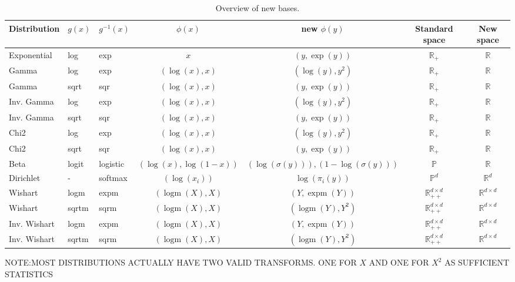 \documentclass{article}
\begin{document}
\begin{table}[htb]
	\centering
	\caption{Overview of new bases.}
	\begin{tabular}{lllcccc}
		\toprule
		\textbf{Distribution}	&\textbf{$g(x)$} &\textbf{$g^{-1}(x)$} & $\phi(x)$ & new $\phi(y)$ & Standard space & New space	\\
		\midrule
		Exponential	& log & exp & $x$ & $(y,\exp(y))$ & $\mathbb{R}_{+}$ & $\mathbb{R}$\\
		Gamma		& log & exp & $(\log(x), x)$ & $(\log(y),y^2)$ & $\mathbb{R}_{+}$ & $\mathbb{R}$\\
		Gamma		& sqrt & sqr & $(\log(x), x)$ & $(y,\exp(y))$ & $\mathbb{R}_{+}$ & $\mathbb{R}$ \\
		Inv. Gamma & log & exp& $(\log(x), x)$ & $(\log(y),y^2)$ & $\mathbb{R}_{+}$ & $\mathbb{R}$\\
		Inv. Gamma & sqrt & sqr& $(\log(x), x)$ & $(y,\exp(y))$ & $\mathbb{R}_{+}$ & $\mathbb{R}$\\
		Chi2        & log & exp &  $(\log(x), x)$ & $(\log(y),y^2)$ & $\mathbb{R}_{+}$ & $\mathbb{R}$\\
		Chi2        & sqrt & sqr &  $(\log(x), x)$ & $(y,\exp(y))$ & $\mathbb{R}_{+}$ & $\mathbb{R}$\\
		Beta		& logit & logistic&  $(\log(x),\log(1-x))$ & $(\log(\sigma(y))), (1-\log(\sigma(y)))$  & $\mathbb{P}$ & $\mathbb{R}$\\
		Dirichlet 	& - & softmax &  $(\log(x_i))$ & $\log(\pi_i(y))$ & $\mathbb{P}^d$ & $\mathbb{R}^d$\\
		Wishart	    & logm & expm & $(\operatorname{logm}(X), X)$ & $(Y, \operatorname{expm}(Y))$ &  $\mathbb{R}^{d\times d}_{++}$ & $\mathbb{R}^{d\times d}$\\
		Wishart	    & sqrtm & sqrm & $(\operatorname{logm}(X), X)$ & $(\operatorname{logm}(Y), Y^2)$ & $\mathbb{R}^{d\times d}_{++}$ & $\mathbb{R}^{d\times d}$\\
		Inv. Wishart & logm & expm & $(\operatorname{logm}(X), X)$ & $(Y, \operatorname{expm}(Y))$ & $\mathbb{R}^{d\times d}_{++}$ & $\mathbb{R}^{d\times d}$\\
		Inv. Wishart & sqrtm & sqrm & $(\operatorname{logm}(X), X)$ & $(\operatorname{logm}(Y), Y^2)$ & $\mathbb{R}^{d\times d}_{++}$ & $\mathbb{R}^{d\times d}$\\
		\bottomrule
	\end{tabular}
\end{table}

NOTE:MOST DISTRIBUTIONS ACTUALLY HAVE TWO VALID TRANSFORMS. ONE FOR $X$ AND ONE FOR $X^2$ AS SUFFICIENT STATISTICS
\end{document}
